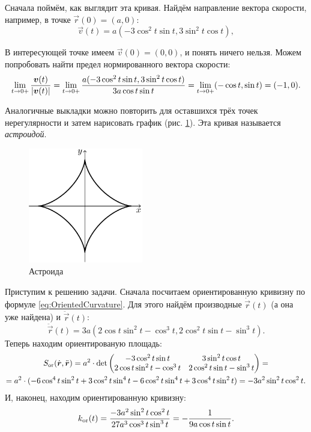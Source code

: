 \begin{solution}
	Сначала поймём, как выглядит эта кривая. Найдём направление вектора скорости, например, в точке $\vec{r}(0) = (a, 0)$:
	\[
		\vec{v}(t) = a(-3\cos^2t\sin t, 3\sin^2t\cos t),
	\]

	В интересующей точке имеем $\vec{v}(0) = (0, 0)$, и понять ничего нельзя. Можем попробовать найти предел нормированного вектора скорости:
	\[
		\lim_{t \to 0+}\frac{\boldsymbol{v}(t)}{\left\lvert\boldsymbol{v}(t)\right\rvert} = \lim_{t \to 0+}\frac{a(-3\cos^2t\sin t, 3\sin^2t\cos t)}{3a\cos t\sin t} = \lim_{t \to 0+}(-\cos t, \sin t) = (-1, 0).
	\]

	Аналогичные выкладки можно повторить для оставшихся трёх точек нерегулярности и затем нарисовать график (рис. \ref{fig:Astroid}). Эта кривая называется \textit{астроидой}.

	\begin{figure}[h]
		\centering
		\includegraphics[width=5cm]{./img/Astroid.pdf}
		\caption{Астроида}
		\label{fig:Astroid}
	\end{figure}

	Приступим к решению задачи. Сначала посчитаем ориентированную кривизну по формуле \eqref{eq:OrientedCurvature}. Для этого найдём производные $\dot{\vec{r}}(t)$ (а она уже найдена) и $\ddot{\vec{r}}(t)$:
	\[
		\ddot{\vec{r}}(t) = 3a(2\cos t\sin^2t - \cos^3t, 2\cos^2t\sin t - \sin^3t).
	\]
	Теперь находим ориентированую площадь:
	\begin{multline*}
		S_{\mathrm{or}}(\dot{\boldsymbol{r}}, \ddot{\boldsymbol{r}}) = a^2 \cdot \det
		\begin{pmatrix}
			-3\cos^2t\sin t & 3\sin^2t\cos t\\
			2\cos t\sin^2 t - \cos^3t & 2\cos^2t\sin t - \sin^3t
		\end{pmatrix} = \\ = a^2 \cdot (-6\cos^4t\sin^2t + 3\cos^2t\sin^4t - 6\cos^2t\sin^4t + 3\cos^4t\sin^2t) = -3a^2\sin^2t\cos^2t.
	\end{multline*}
	И, наконец, находим ориентированную кривизну:
	\[
		k_{\mathrm{or}}(t) = \frac{-3a^2\sin^2t\cos^2t}{27a^3\cos^3t\sin^3t} = -\frac{1}{9a\cos t\sin t}.
	\]


\end{solution}
